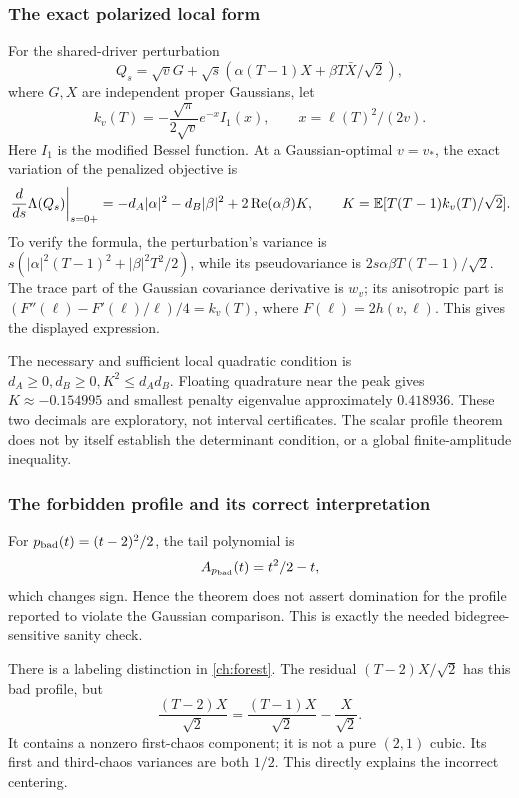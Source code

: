 \subsubsection{The exact polarized local form}

For the shared-driver perturbation
\[
Q_s=\sqrt vG+\sqrt s\left(\alpha(T-1)X+
                     \beta T\bar X/\sqrt2\right),
\]
where \(G,X\) are independent proper Gaussians, let
\[
k_v(T)=-\frac{\sqrt\pi}{2\sqrt v}e^{-x}I_1(x),
\qquad x=\ell(T)^2/(2v).
\]
Here \(I_1\) is the modified Bessel function. At a Gaussian-optimal
\(v=v_*\), the exact variation of the penalized objective is
\[
\left.\frac{d}{ds}\Lambda(Q_s)\right|_{s=0+}
=-d_A|\alpha|^2-d_B|\beta|^2
 +2\operatorname{Re}(\alpha\beta)K,\qquad
K=\mathbb E[T(T-1)k_v(T)/\sqrt2].
\]
To verify the formula, the perturbation's variance is
\(s(|\alpha|^2(T-1)^2+|\beta|^2T^2/2)\), while its pseudovariance is
\(2s\alpha\beta T(T-1)/\sqrt2\). The trace part of the Gaussian
covariance derivative is \(w_v\); its anisotropic part is
\((F''(\ell)-F'(\ell)/\ell)/4=k_v(T)\), where
\(F(\ell)=2h(v,\ell)\). This gives the displayed expression.

The necessary and sufficient local quadratic condition is
\(d_A\ge0,d_B\ge0,K^2\le d_Ad_B\).
Floating quadrature near the peak gives \(K\approx-0.154995\)
and smallest penalty eigenvalue approximately \(0.418936\).
These two decimals are exploratory, not interval certificates.
The scalar profile theorem does not by itself establish the
determinant condition, or a global finite-amplitude inequality.

\subsubsection{The forbidden profile and its correct interpretation}

For \(p_{\rm bad}(t)=(t-2)^2/2\), the tail polynomial is
\[
A_{p_{\rm bad}}(t)=t^2/2-t,
\]
which changes sign. Hence the theorem does not assert domination
for the profile reported to violate the Gaussian comparison.
This is exactly the needed bidegree-sensitive sanity check.

There is a labeling distinction in \autoref{ch:forest}. The residual
\((T-2)X/\sqrt2\) has this bad profile, but
\[
\frac{(T-2)X}{\sqrt2}
=\frac{(T-1)X}{\sqrt2}-\frac X{\sqrt2}.
\]
It contains a nonzero first-chaos component; it is not a pure
\((2,1)\) cubic. Its first and third-chaos variances are both \(1/2\).
This directly explains the incorrect centering.

